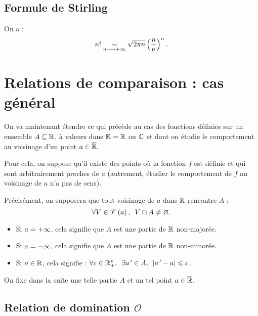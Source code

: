 \subsection{Formule de Stirling}

\begin{theo}
On a : \[n!\underset{n\longrightarrow+\infty}{\sim}\sqrt{2\pi n}\left(\dfrac{n}{\mathrm{e}^{}}\right)^n.\]
\end{theo}

\begin{dem}
\end{dem}

\section{Relations de comparaison : cas général}

On va maintenant étendre ce qui précède au cas des fonctions définies sur un ensemble \(A\subseteq\mathbb{R}\), à valeurs dans \(\mathbb{K}=\mathbb{R}\) ou \(\mathbb{C}\) et dont on étudie le comportement au voisinage d'un point \(a\in\overline{\mathbb{R}}\).

Pour cela, on suppose qu'il existe des points où la fonction \(f\) est définie et qui sont arbitrairement proches de \(a\) (autrement, étudier le comportement de \(f\) au voisinage de \(a\) n'a pas de sens).

Précisément, on supposera que tout voisinage de \(a\) dans \(\mathbb{R}\) rencontre \(A\) : \[\quantifs{\forall V\in\V{a}}V\inter A\not=\ensvide.\]

\begin{itemize}
    \item Si \(a=+\infty\), cela signifie que \(A\) est une partie de \(\mathbb{R}\) non-majorée. \\
    \item Si \(a=-\infty\), cela signifie que \(A\) est une partie de \(\mathbb{R}\) non-minorée. \\
    \item Si \(a\in\mathbb{R}\), cela signifie : \(\quantifs{\forall\epsilon\in\Rps;\exists a\prim\in A}\abs{a\prim-a}\leq\epsilon\).
\end{itemize}

On fixe dans la suite une telle partie \(A\) et un tel point \(a\in\overline{\mathbb{R}}\).

\subsection{Relation de domination \(\mathscr{O}\)}

